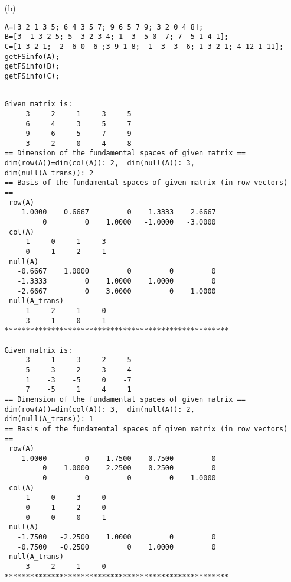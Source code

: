 \begin{sol}
\begin{enumerate}
\item[(b)]
\begin{verbatim}
A=[3 2 1 3 5; 6 4 3 5 7; 9 6 5 7 9; 3 2 0 4 8];
B=[3 -1 3 2 5; 5 -3 2 3 4; 1 -3 -5 0 -7; 7 -5 1 4 1];
C=[1 3 2 1; -2 -6 0 -6 ;3 9 1 8; -1 -3 -3 -6; 1 3 2 1; 4 12 1 11];
getFSinfo(A);
getFSinfo(B);
getFSinfo(C);
\end{verbatim}


\begin{outputs}
\begin{verbatim}

Given matrix is:
     3     2     1     3     5
     6     4     3     5     7
     9     6     5     7     9
     3     2     0     4     8
== Dimension of the fundamental spaces of given matrix ==
dim(row(A))=dim(col(A)): 2,	 dim(null(A)): 3,	 dim(null(A_trans)): 2
== Basis of the fundamental spaces of given matrix (in row vectors) ==
 row(A)
    1.0000    0.6667         0    1.3333    2.6667
         0         0    1.0000   -1.0000   -3.0000
 col(A)
     1     0    -1     3
     0     1     2    -1
 null(A)
   -0.6667    1.0000         0         0         0
   -1.3333         0    1.0000    1.0000         0
   -2.6667         0    3.0000         0    1.0000
 null(A_trans)
     1    -2     1     0
    -3     1     0     1
*****************************************************

Given matrix is:
     3    -1     3     2     5
     5    -3     2     3     4
     1    -3    -5     0    -7
     7    -5     1     4     1
== Dimension of the fundamental spaces of given matrix ==
dim(row(A))=dim(col(A)): 3,	 dim(null(A)): 2,	 dim(null(A_trans)): 1
== Basis of the fundamental spaces of given matrix (in row vectors) ==
 row(A)
    1.0000         0    1.7500    0.7500         0
         0    1.0000    2.2500    0.2500         0
         0         0         0         0    1.0000
 col(A)
     1     0    -3     0
     0     1     2     0
     0     0     0     1
 null(A)
   -1.7500   -2.2500    1.0000         0         0
   -0.7500   -0.2500         0    1.0000         0
 null(A_trans)
     3    -2     1     0
*****************************************************


\end{verbatim}
\end{outputs}
\end{enumerate}
\end{sol}
